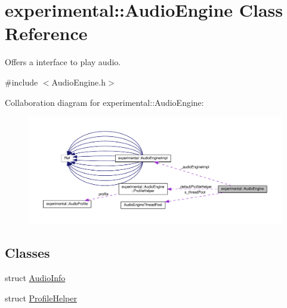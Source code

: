 \hypertarget{classexperimental_1_1AudioEngine}{}\section{experimental\+:\+:Audio\+Engine Class Reference}
\label{classexperimental_1_1AudioEngine}


Offers a interface to play audio.  




{\ttfamily \#include $<$Audio\+Engine.\+h$>$}



Collaboration diagram for experimental\+:\+:Audio\+Engine\+:
\nopagebreak
\begin{figure}[H]
\begin{center}
\leavevmode
\includegraphics[width=350pt]{classexperimental_1_1AudioEngine__coll__graph}
\end{center}
\end{figure}
\subsection*{Classes}
\begin{DoxyCompactItemize}
\item 
struct \hyperlink{structexperimental_1_1AudioEngine_1_1AudioInfo}{Audio\+Info}
\item 
struct \hyperlink{structexperimental_1_1AudioEngine_1_1ProfileHelper}{Profile\+Helper}
\end{DoxyCompactItemize}
